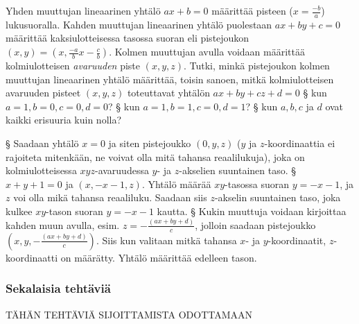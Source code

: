 \begin{tehtavasivu}
\begin{tehtava}
  Yhden muuttujan lineaarinen yhtälö $ax +b = 0$ määrittää pisteen ($x = \frac{-b}{a}$) lukusuoralla.
  Kahden muuttujan lineaarinen yhtälö puolestaan $ax +by +c = 0$ määrittää kaksiulotteisessa tasossa suoran eli pistejoukon $(x,y) = (x, \frac{-a}{b}x - \frac{c}{b})$.
  Kolmen muuttujan avulla voidaan määrittää kolmiulotteisen \emph{avaruuden} piste $(x, y, z)$.
  Tutki, minkä pistejoukon kolmen muuttujan lineaarinen yhtälö määrittää, toisin sanoen, mitkä kolmiulotteisen avaruuden pisteet $(x, y, z)$ toteuttavat yhtälön $ax +by +cz +d = 0$
  \alakohdat
    § kun $a = 1, b = 0, c= 0, d=0$?
    § kun $a = 1, b = 1, c= 0, d=1$?
    § kun $a, b, c$ ja $d$ ovat kaikki erisuuria kuin nolla?
  \loppu
  \begin{vastaus}
    \alakohdat
      § Saadaan yhtälö  $x = 0$ ja siten pistejoukko $(0, y, z)$ ($y$ ja $z$-koordinaattia ei rajoiteta mitenkään, ne voivat olla mitä tahansa reaalilukuja), joka on kolmiulotteisessa $xyz$-avaruudessa $y$- ja $z$-akselien suuntainen taso. 
      § $x + y +1 = 0$ ja $ (x, -x -1, z)$. Yhtälö määrää $xy$-tasossa suoran $y = -x-1$, ja $z$ voi olla mikä tahansa reaaliluku. Saadaan siis $z$-akselin suuntainen taso, joka kulkee $xy$-tason suoran $y = -x-1$ kautta.
      § Kukin muuttuja voidaan kirjoittaa kahden muun avulla, esim. $ z= -\frac{(ax + by + d)}{c}$, jolloin saadaan pistejoukko $(x, y, -\frac{(ax + by + d)}{c})$. Siis kun valitaan mitkä tahansa $x$- ja $y$-koordinaatit, $z$-koordinaatti on määrätty. Yhtälö määrittää edelleen tason.
    \loppu
  \end{vastaus}
\end{tehtava}

\subsubsection*{Sekalaisia tehtäviä}

TÄHÄN TEHTÄVIÄ SIJOITTAMISTA ODOTTAMAAN

\end{tehtavasivu}
